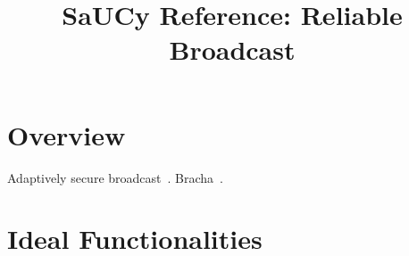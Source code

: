 \documentclass{llncs}
\title{SaUCy Reference: Reliable Broadcast}
\author{}
\institute{}
\begin{document}
\maketitle

\section{Overview}

Adaptively secure broadcast~\cite{garay2011adaptively}. Bracha~\cite{bracha1987asynchronous}.

\section{Ideal Functionalities}

\begin{comment}
\begin{boxdef}{Functionality}{$\Func{BC}$}
  $\Func{BC}$ interacts with an adversary $\mc{S}$ and a set $\mc{P} = \{
  P_1, \ldots, P_n \}$ of parties.
  \begin{enumerate}
    \item Upon receiving $({\sf Bcast}, sid, m)$ from $P_i$, send $({\sf Bcast},
  sid, P_i, m)$ to all parties in $\mc{P}$ and to $\mc{S}$.
  \end{enumerate}
\end{boxdef}


\begin{boxdef}{Functionality}{$\Func{RBC}$}
  $\Func{RBC}$ interacts with an adversary $\mc{S}$ and a set $\mc{P} = \{
  P_1, \ldots, P_n \}$ of parties.
  \begin{enumerate}
    \item Upon receiving $({\sf Bcast}, sid, m)$ from $P_i$, leak $({\sf Bcast},
  sid, P_i, m)$ to $\mc{S}$.
  
    \item Upon receiving $m'$ from $\mc{S}$, do:
    
    \begin{itemize}
      \item If $P_i$ is corrupted, send $({\sf Bcast}, sid, P_i, m')$ to all
  parties in $\mc{P}$.
  
      \item If $P_i$ is not corrupted, send $({\sf Bcast}, sid, P_i, m)$ to all
  parties in $\mc{P}$.
    \end{itemize}
  \end{enumerate}
\end{boxdef}
\end{comment}
\end{document}
